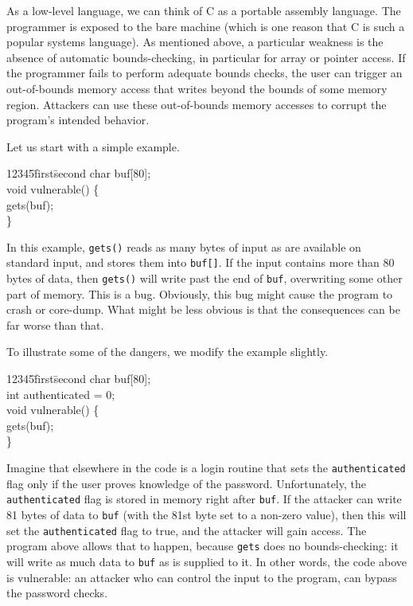 \documentclass[11pt]{article}
\begin{document}
As a low-level language, we can think of
C as a portable assembly language. The programmer is exposed to the
bare machine (which is one reason that C is such a popular systems
language). As mentioned above, a particular weakness is the absence
of automatic bounds-checking, in particular for array or pointer access. 
If the programmer fails to perform adequate
bounds checks, the user can trigger an out-of-bounds memory access that writes
beyond the bounds of some memory region.  Attackers can use these
out-of-bounds memory accesses to corrupt the program’s intended
behavior.  

Let us start with a simple example.

\begin{ttfamily}
\begin{tabbing}
12345\=first\=second \kill
char buf[80];\\
void vulnerable() \{ \\
\>gets(buf);\\
\}\\
\end{tabbing}
\end{ttfamily}

In this example, \texttt{gets()} reads as many bytes of input as are available
on standard input, and stores them into \texttt{buf[]}. If the input contains
more than 80 bytes of data, then \texttt{gets()} will write past the end of
\texttt{buf}, overwriting some other part of memory. This is a bug. Obviously,
this bug might cause the program to crash or core-dump.  What might be
less obvious is that the consequences can be far worse than that.

To illustrate some of the dangers, we modify
the example slightly.

\begin{ttfamily}
\begin{tabbing}
12345\=first\=second \kill
char buf[80];\\
int authenticated = 0;\\
void vulnerable() \{\\
\>gets(buf);\\
\}\\
\end{tabbing}
\end{ttfamily}

Imagine that elsewhere in the code is a login routine that sets the
\texttt{authenticated} flag only if the user proves knowledge of the
password.  Unfortunately, the \texttt{authenticated} flag is stored in memory
right after \texttt{buf}. If the attacker can write 81 bytes of data to \texttt{buf}
(with the 81st byte set to a non-zero value), then this will set the
\texttt{authenticated} flag to true, and the attacker will gain access. The
program above allows that to happen, because \texttt{gets} does no
bounds-checking: it will write as much data to \texttt{buf} as is supplied to
it. In other words, the code above is vulnerable: an attacker who can
control the input to the program, can bypass the password checks.
\end{document}
